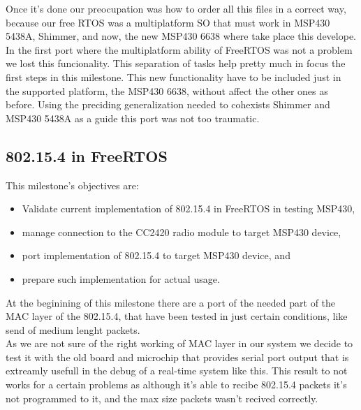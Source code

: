 		Once it's done our preocupation was how to order all this files in a correct way, because our free RTOS was a multiplatform SO that must work in MSP430 5438A, Shimmer, and now, the new MSP430 6638 where take place this develope. In the first port where the multiplatform ability of FreeRTOS was not a problem we lost this funcionality. This separation of tasks help pretty much in focus the first steps in this milestone. This new functionality have to be included just in the supported platform, the MSP430 6638, without affect the other ones as before. Using the preciding generalization needed to cohexists Shimmer and MSP430 5438A as a guide this port was not too traumatic.

		\subsection{802.15.4 in FreeRTOS}
		\label{ssec:802.15.4.FreeRTOS}	
		This milestone's objectives are:
		\begin{itemize}
		\item Validate current implementation of 802.15.4 in FreeRTOS in testing MSP430,
		\item manage connection to the CC2420 radio module to target MSP430 device,
		\item port implementation of 802.15.4 to target MSP430 device, and
		\item prepare such implementation for actual usage.
		\end{itemize}
		At the beginining of this milestone there are a port of the needed part of the MAC layer of the 802.15.4, that have been tested in just certain conditions, like send of medium lenght packets.\\

		As we are not sure of the right working of MAC layer in our system we decide to test it with the old board and microchip that provides serial port output that is extreamly usefull in the debug of a real-time system like this. This result to not works for a certain problems as although it's able to recibe 802.15.4 packets it's not programmed to it, and the max size packets wasn't recived correctly.\\

